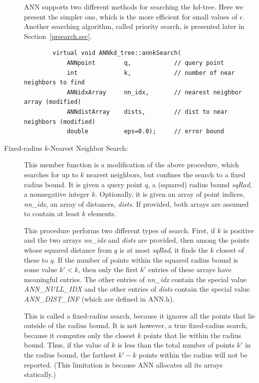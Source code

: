 \documentclass[11pt]{article}		%
\newcommand{\ANN}[0]{\textsf{ANN}}
\begin{document}
\begin{description}
	{\ANN} supports two different methods for searching the kd-tree.
	Here we present the simpler one, which is the more efficient for
	small values of $\epsilon$.  Another searching algorithm, called
	priority search, is presented later in Section~\ref{prsearch.sec}.

	{\small \begin{verbatim}
	    virtual void ANNkd_tree::annkSearch(
	        ANNpoint        q,            // query point
	        int             k,            // number of near neighbors to find
	        ANNidxArray     nn_idx,       // nearest neighbor array (modified)
	        ANNdistArray    dists,        // dist to near neighbors (modified)
	        double          eps=0.0);     // error bound
	\end{verbatim} }

\item[Fixed-radius $k$-Nearest Neighbor Search:] This member function is
	a modification of the above procedure, which searches for up to $k$
	nearest neighbors, but confines the search to a fixed radius bound.
	It is given a query point $q$, a (squared) radius bound
	\textit{sqRad}, a nonnegative integer $k$.  Optionally, it is given
	an array of point indices, \textit{nn\_idx}, an array of distances,
	\textit{dists}.  If provided, both arrays are assumed to contain at
	least $k$ elements.

	This procedure performs two different types of search.  First, if
	$k$ is positive and the two arrays \textit{nn\_idx} and
	\textit{dists} are provided, then among the points whose squared
	distance from $q$ is at most \textit{sqRad}, it finds the $k$
	closest of these to $q$.  If the number of points within the squared
	radius bound is some value $k'< k$, then only the first $k'$ entries
	of these arrays have meaningful entries.  The other entries of
	\textit{nn\_idx} contain the special value \textit{ANN\_NULL\_IDX}
	and the other entries of \textit{dists} contain the special value
	\textit{ANN\_DIST\_INF} (which are defined in \textsf{ANN.h}).

	This is called a fixed-radius search, because it ignores all the
	points that lie outside of the radius bound.  It is not however, a
	true fixed-radius search, because it computes only the closest $k$
	points that lie within the radius bound.  Thus, if the value of $k$
	is less than the total number of points $k'$ in the radius bound,
	the farthest $k'-k$ points within the radius will not be reported.
	(This limitation is because {\ANN} allocates all its arrays
	statically.)
	

\end{description}
\end{document}
